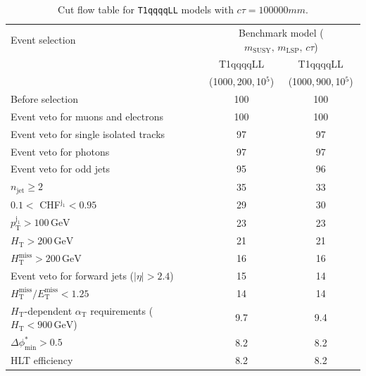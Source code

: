 \begin{table}[!h]
  \caption{Cut flow table for \texttt{T1qqqqLL} models with $c\tau = 100000\unit{mm}$.} 
  \label{tab:cut_flow_ctau_100000}
{\scriptsize%
\centering
\begin{tabular}{lcc}
  \hline
  Event selection & \multicolumn{2}{c}{Benchmark model ($m_\mathrm{SUSY},\,m_\mathrm{LSP},\,c\tau$)} \\
  \cline{2-3}
   & T1qqqqLL & T1qqqqLL \\
    & (1000,\,200,\,10$^5$) & (1000,\,900,\,10$^5$) \\
  \hline
  Before selection  & 100\phantom{.1} & 100\phantom{.1} \\
  Event veto for muons and electrons & 100\phantom{.1} & 100\phantom{.1} \\
  Event veto for single isolated tracks & \phantom{1}97\phantom{.1} & \phantom{1}97\phantom{.1} \\
  Event veto for photons & \phantom{1}97\phantom{.1} & \phantom{1}97\phantom{.1} \\
  Event veto for odd jets & \phantom{1}95\phantom{.1} & \phantom{1}96\phantom{.1} \\
   $n_{\mathrm{jet}} \geq 2$  & \phantom{1}35\phantom{.1} & \phantom{1}33\phantom{.1} \\
   $0.1 <$ CHF$^{\mathrm{j_1}} < 0.95$ & \phantom{1}29\phantom{.1} & \phantom{1}30\phantom{.1} \\
   $p_{\mathrm{T}}^{\mathrm{j_1}} > 100\,\mathrm{GeV}$ & \phantom{1}23\phantom{.1} & \phantom{1}23\phantom{.1} \\
   $H_{\mathrm{T}} > 200\,\mathrm{GeV}$  & \phantom{1}21\phantom{.1} & \phantom{1}21\phantom{.1} \\
  $H_{\mathrm{T}}^{\mathrm{miss}} > 200\,\mathrm{GeV}$  & \phantom{1}16\phantom{.1} & \phantom{1}16\phantom{.1} \\
  Event veto for forward jets ($|\eta| > 2.4$) & \phantom{1}15\phantom{.1} & \phantom{1}14\phantom{.1} \\
  $H_{\mathrm{T}}^{\mathrm{miss}} / E_{\mathrm{T}}^{\mathrm{miss}} < 1.25$ & \phantom{1}14\phantom{.1} & \phantom{1}14\phantom{.1} \\
  $H_{\mathrm{T}}$-dependent $\alpha_{\mathrm{T}}$ requirements ($H_{\mathrm{T}} < 900\,\mathrm{GeV}$)  &  \phantom{10}9.7 & \phantom{10}9.4 \\
  $\Delta\phi^{*}_{\mathrm{min}} > 0.5$  & \phantom{10}8.2 & \phantom{10}8.2 \\
  \hline
  HLT efficiency &  \phantom{10}8.2 &  \phantom{10}8.2 \\
  \hline
\end{tabular}
}
\end{table}


